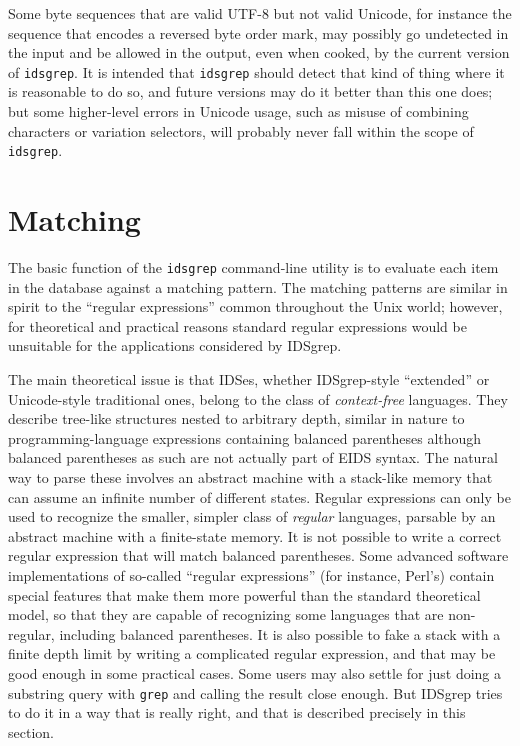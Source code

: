 \documentclass[twocolumn]{report}
\begin{document}
Some byte sequences that are valid UTF-8 but not valid Unicode, for instance
the sequence that encodes a reversed byte order mark, may possibly go
undetected in the input and be allowed in the output, even when cooked, by
the current version of \texttt{idsgrep}.  It is intended that
\texttt{idsgrep} should detect that kind of thing where it is reasonable to
do so, and future versions may do it better than this one does; but some
higher-level errors in Unicode usage, such as misuse of combining characters
or variation selectors, will probably never fall within the scope of
\texttt{idsgrep}.


\section{Matching}

The basic function of the \texttt{idsgrep} command-line utility is to
evaluate each item in the database against a matching pattern.  The matching
patterns are similar in spirit to the ``regular expressions'' common
throughout the Unix world; however, for theoretical and practical reasons
standard regular expressions would be unsuitable for the applications
considered by IDSgrep.

The main theoretical issue is that IDSes, whether IDSgrep-style ``extended''
or Unicode-style traditional ones, belong to the class of
\emph{context-free} languages.  They describe tree-like structures nested to
arbitrary depth, similar in nature to programming-language expressions
containing balanced parentheses although balanced parentheses as such are
not actually part of EIDS syntax.  The natural way to parse these involves
an abstract machine with a stack-like memory that can assume an infinite
number of different states.  Regular expressions can only be used to
recognize the smaller, simpler class of \emph{regular} languages, parsable
by an abstract machine with a finite-state memory.  It is not possible to
write a correct regular expression that will match balanced parentheses. 
Some advanced software implementations of so-called ``regular expressions''
(for instance, Perl's) contain special features that make them more powerful
than the standard theoretical model, so that they are capable of recognizing
some languages that are non-regular, including balanced parentheses.  It is
also possible to fake a stack with a finite depth limit by writing a
complicated regular expression, and that may be good enough in some
practical cases.  Some users may also settle for just doing a substring
query with \texttt{grep} and calling the result close enough.  But IDSgrep
tries to do it in a way that is really right, and that is described
precisely in this section.
\end{document}
